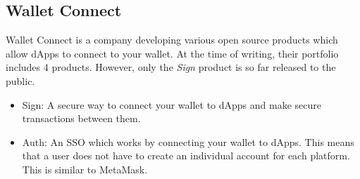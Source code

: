 \subsection{Wallet Connect}
\label{sec:sota:walletConnect}
Wallet Connect \cite{walletConnect} is a company developing various open source products which allow dApps to connect to your wallet. At the time of writing, their portfolio includes 4 products. However, only the \textit{Sign} product is so far released to the public.

\begin{itemize}
	\item Sign: A secure way to connect your wallet to dApps and make secure transactions between them. \cite{walletConnect}
	\item Auth: An SSO which works by connecting your wallet to dApps. This means that a user does not have to create an individual account for each platform. This is similar to MetaMask. \cite{walletConnect}
\end{itemize}
